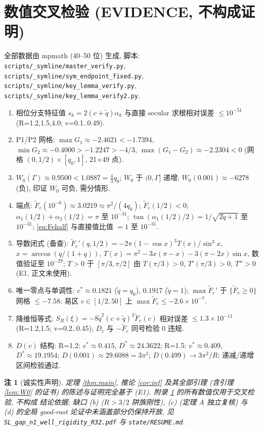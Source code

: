 \documentclass[UTF8]{ctexart}
\newtheorem{remark}[theorem]{注}
\begin{document}
\section{数值交叉检验 (EVIDENCE, 不构成证明)}\label{app:evid}

全部数据由 mpmath (40--50 位) 生成, 脚本:
\texttt{scripts/\_symline/master\_verify.py},
\texttt{scripts/\_symline/sym\_endpoint\_fixed.py},
\texttt{scripts/\_symline/key\_lemma\_verify.py},
\texttt{scripts/\_symline/key\_lemma\_verify2.py}.
\begin{enumerate}
	\item 相位分支特征值 $s_k=2(c+\tilde q)\alpha_k$ 与直接 secular 求根相对误差
		$\le10^{-51}$ (R=1.2,1.5,4.0; v=0.1..0.49).
	\item P1/P2 网格: $\max G_1\approx-2.4621<-1.7394$,
		$\min G_2\approx-0.4000>-1.2247>-4/3$,
		$\max(G_1-G_2)\approx-2.2304<0$ (网格 $(0,1/2)\times[q_0,1]$, 21$\times$49 点).
	\item $W_0(\Gamma)\approx0.9500<1.0887=\frac43 q_0$; $W_0$ 于 $(0,\Gamma]$ 递增;
		$W_0(0.001)\approx-6278$ (负), 印证 $W_0$ 可负, 需分情形.
	\item 端点: $\widetilde F_e(10^{-6})\approx3.0219\approx\pi^2/(4q_0)$;
		$\widetilde F_e(1/2)<0$; $\alpha_1(1/2)+\alpha_2(1/2)=\pi$ 至 $10^{-31}$;
		$\tan(\alpha_1(1/2)/2)=1/\sqrt{2\tilde q+1}$ 至 $10^{-31}$;
		\eqref{eq:Fehalf} 与直接值比值 $=1$ 至 $10^{-31}$.
	\item 导数闭式 (备查): $\widetilde F_e'(q,1/2)=
		-2\pi(1-\cos x)^3T(x)/\sin^3x$, $x=\arccos(q/(1+q))$,
		$T(x)=\pi^2-3x(\pi-x)-3(\pi-2x)\sin x$, 数值验证至 $10^{-29}$;
		$T>0$ 于 $[\pi/3,\pi/2]$ 由 $T(\pi/3)>0$, $T'(\pi/3)>0$, $T''>0$
		(E1, 正文未使用).
	\item 唯一零点与单调性: $c^*\approx0.1821$ ($\tilde q=q_0$), $0.1917$
		($\tilde q=1$); $\max\widetilde F_e'$ 于 $\{\widetilde F_e\ge0\}$ 网格
		$\le-7.58$; 易区 $c\in[1/2,50]$ 上 $\max\widetilde F_e\le-2.6\times10^{-7}$.
	\item 降维恒等式: $S_R(\xi)=-8\tilde q^2(c+\tilde q)^3\widetilde F_e(c)$ 相对误差
		$\le1.3\times10^{-11}$ (R=1.2,1.5; v=0.2..0.45); $D_c$ 与 $-\widetilde F_e$
		同号检验 0 违规.
	\item $D(v)$ 结构: R=1.2: $v^*\approx0.415$, $D^*\approx24.3622$;
		R=1.5: $v^*\approx0.409$, $D^*\approx19.1954$; $D(0.001)\approx29.6088
		=3\pi^2$; $D(0.499)\to3\pi^2/R$; 递减/递增区间检验通过.
\end{enumerate}

\begin{remark}[诚实性声明]
定理 \ref{thm:main}, 推论 \ref{cor:inf} 及其全部引理 (含引理 \ref{lem:W0} 的证书)
的陈述与证明完全基于 (E1). 附录 \ref{app:evid} 的所有数值仅用于交叉检验, 不构成
结论依据; 缺口 (b) ($R>3/2$ 阱族刚性), (c) (定理 A 独立复核) 与 (d) 的全局
good-root 论证中未涵盖部分仍保持开放, 见 \texttt{SL\_gap\_n1\_well\_rigidity\_R32.pdf}
与 \texttt{state/RESUME.md}.
\end{remark}
\end{document}
